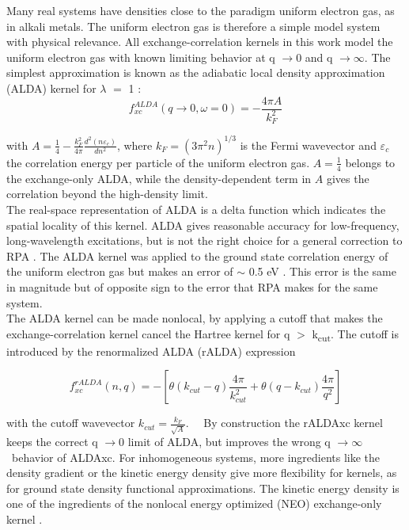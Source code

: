 \documentclass[aps,amsmath,amssymb, preprint, 12pt]{revtex4-1}
\begin{document}
Many real systems have densities close to the paradigm uniform electron gas, as in alkali metals. The uniform electron gas is therefore a simple model system with physical relevance. All exchange-correlation kernels in this work model the uniform electron gas with known limiting behavior at q \(  \rightarrow 0 \)  and q \(  \rightarrow \infty. \)  The simplest approximation is known as the adiabatic local density approximation (ALDA) kernel for $\lambda$ $=$ 1 \cite{ZS80}:\\

\begin{equation}
f_{xc}^{ALDA} ( q \rightarrow 0,  \omega =0 ) =-\frac{4 \pi A}{k_{F}^{2}}
\end{equation}

\noindent with  \( A=\frac{1}{4}-\frac{k_{F}^{2}}{4 \pi }\frac{d^{2} \left( n \varepsilon _{c} \right) }{dn^{2}} \), where  \( k_{F}= \left( 3 \pi ^{2}n \right) ^{1/3} \)  is the Fermi wavevector and  \(  \varepsilon _{c} \)  the correlation energy per particle of the uniform electron gas.  \( A=\frac{1}{4} \)  belongs to the exchange-only ALDA, while the density-dependent term in  \( A \)  gives the correlation beyond the high-density limit.\\

The real-space representation of ALDA is a delta function which indicates the spatial locality of this kernel. ALDA gives reasonable accuracy for low-frequency, long-wavelength excitations, but is not the right choice for a general correction to RPA \cite{ZS80}. The ALDA kernel was applied to the ground state correlation energy of the uniform electron gas but makes an error of $ \sim $ 0.5 eV \cite{LGP00}. This error is the same in magnitude but of opposite sign to the error that RPA makes for the same system.\\

The ALDA kernel can be made nonlocal, by applying a cutoff that makes the exchange-correlation kernel cancel the Hartree kernel for q $>$ k\textsubscript{cut}. The cutoff is introduced by the renormalized ALDA (rALDA) expression \cite{OT12}

\begin{equation}
 f_{xc}^{rALDA} ( n,q) =- [ \theta ( k_{cut}-q ) \frac{4 \pi }{k_{cut}^{2}}+ \theta  ( q-k_{cut} ) \frac{4 \pi }{q^{2}} ]
\end{equation}

\noindent with the cutoff wavevector   \( k_{cut}=\frac{k_{F}}{\sqrt{A}}. \) \ \ By construction the rALDAxc kernel keeps the correct  q \(  \rightarrow 0 \)  limit of ALDA, but improves the wrong q \(  \rightarrow \infty \) \  behavior of ALDAxc. For inhomogeneous systems, more ingredients like the density gradient or the kinetic energy density give more flexibility for kernels, as for ground state density functional approximations. The kinetic energy density is one of the ingredients of the nonlocal energy optimized (NEO) exchange-only kernel \cite{BLR16}.\\
\end{document}
